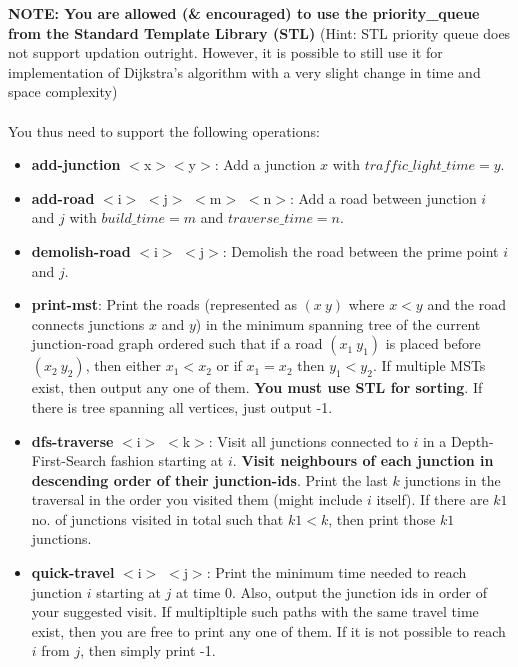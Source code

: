 \documentclass[20pt]{article}
\begin{document}
\textbf{NOTE: You are allowed (\& encouraged) to use the priority\_queue from the Standard Template Library (STL)} (Hint: STL priority queue does not support updation outright. However, it is possible to still use it for implementation of Dijkstra's algorithm with a very slight change in time and space complexity)
\\\\
You thus need to support the following operations:
\begin{itemize}

\item \textbf{add-junction} $<$x$>$$<$y$>$: Add a junction $x$ with $traffic\_light\_time = y$.
\item \textbf{add-road} $<$i$>$ $<$j$>$ $<$m$>$ $<$n$>$: Add a road between junction $i$ and $j$ with $build\_time = m$ and $traverse\_time = n$.
\item \textbf{demolish-road} $<$i$>$ $<$j$>$: Demolish the road between the prime point $i$ and $j$. 
\item \textbf{print-mst}: Print the roads (represented as $(x \ y)$ where $x<y$ and the road connects junctions $x$ and $y$) in the minimum spanning tree of the current junction-road graph ordered such that if a road $(x_1 \ y_1)$ is placed before $(x_2 \ y_2)$, then either $x_1 < x_2$ or if $x_1 = x_2$ then $y_1 < y_2$. If multiple MSTs exist, then output any one of them. \textbf{You must use STL for sorting}. If there is tree spanning all vertices, just output -1.
\item \textbf{dfs-traverse} $<$i$>$ $<$k$>$: Visit all junctions connected to $i$ in a Depth-First-Search fashion starting at $i$. \textbf{Visit neighbours of each junction in descending order of their junction-ids}. Print the last $k$ junctions in the traversal in the order you visited them (might include $i$ itself). If there are $k1$ no. of junctions visited in total such that $k1 < k$, then print those $k1$ junctions.
\item \textbf{quick-travel} $<$i$>$ $<$j$>$: Print the minimum time needed to reach junction $i$ starting at $j$ at time 0. Also, output the junction ids in order of your suggested visit. If multipltiple such paths with the same travel time exist, then you are free to print any one of them. If it is not possible to reach $i$ from $j$, then simply print -1.
\end{itemize}
\end{document}
